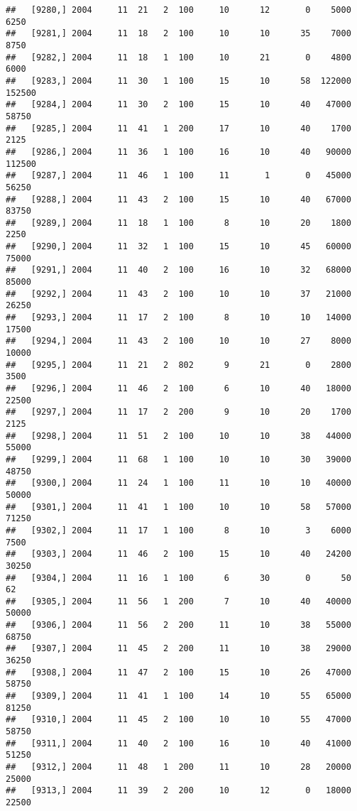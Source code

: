 \documentclass{article}\usepackage[]{graphicx}\usepackage[]{color}
\makeatletter
\newenvironment{kframe}{%
 \def\at@end@of@kframe{}%
 \ifinner\ifhmode%
  \def\at@end@of@kframe{\end{minipage}}%
  \begin{minipage}{\columnwidth}%
 \fi\fi%
 \def\FrameCommand##1{\hskip\@totalleftmargin \hskip-\fboxsep
 \colorbox{shadecolor}{##1}\hskip-\fboxsep
     \hskip-\linewidth \hskip-\@totalleftmargin \hskip\columnwidth}%
 \MakeFramed {\advance\hsize-\width
   \@totalleftmargin\z@ \linewidth\hsize
   \@setminipage}}%
 {\par\unskip\endMakeFramed%
 \at@end@of@kframe}
\newenvironment{knitrout}{}{} %
\makeatother
\begin{document}
\begin{knitrout}
\begin{kframe}
\begin{verbatim}
##   [9280,] 2004     11  21   2  100     10      12       0    5000    6250
##   [9281,] 2004     11  18   2  100     10      10      35    7000    8750
##   [9282,] 2004     11  18   1  100     10      21       0    4800    6000
##   [9283,] 2004     11  30   1  100     15      10      58  122000  152500
##   [9284,] 2004     11  30   2  100     15      10      40   47000   58750
##   [9285,] 2004     11  41   1  200     17      10      40    1700    2125
##   [9286,] 2004     11  36   1  100     16      10      40   90000  112500
##   [9287,] 2004     11  46   1  100     11       1       0   45000   56250
##   [9288,] 2004     11  43   2  100     15      10      40   67000   83750
##   [9289,] 2004     11  18   1  100      8      10      20    1800    2250
##   [9290,] 2004     11  32   1  100     15      10      45   60000   75000
##   [9291,] 2004     11  40   2  100     16      10      32   68000   85000
##   [9292,] 2004     11  43   2  100     10      10      37   21000   26250
##   [9293,] 2004     11  17   2  100      8      10      10   14000   17500
##   [9294,] 2004     11  43   2  100     10      10      27    8000   10000
##   [9295,] 2004     11  21   2  802      9      21       0    2800    3500
##   [9296,] 2004     11  46   2  100      6      10      40   18000   22500
##   [9297,] 2004     11  17   2  200      9      10      20    1700    2125
##   [9298,] 2004     11  51   2  100     10      10      38   44000   55000
##   [9299,] 2004     11  68   1  100     10      10      30   39000   48750
##   [9300,] 2004     11  24   1  100     11      10      10   40000   50000
##   [9301,] 2004     11  41   1  100     10      10      58   57000   71250
##   [9302,] 2004     11  17   1  100      8      10       3    6000    7500
##   [9303,] 2004     11  46   2  100     15      10      40   24200   30250
##   [9304,] 2004     11  16   1  100      6      30       0      50      62
##   [9305,] 2004     11  56   1  200      7      10      40   40000   50000
##   [9306,] 2004     11  56   2  200     11      10      38   55000   68750
##   [9307,] 2004     11  45   2  200     11      10      38   29000   36250
##   [9308,] 2004     11  47   2  100     15      10      26   47000   58750
##   [9309,] 2004     11  41   1  100     14      10      55   65000   81250
##   [9310,] 2004     11  45   2  100     10      10      55   47000   58750
##   [9311,] 2004     11  40   2  100     16      10      40   41000   51250
##   [9312,] 2004     11  48   1  200     11      10      28   20000   25000
##   [9313,] 2004     11  39   2  200     10      12       0   18000   22500

\end{verbatim}
\end{kframe}
\end{knitrout}
\end{document}
